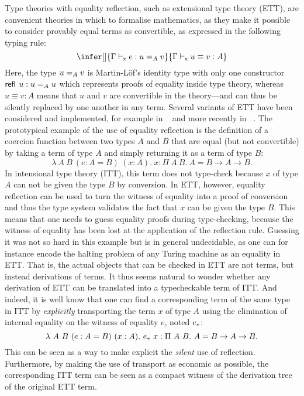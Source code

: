 Type theories with equality reflection, such as extensional type
theory (ETT), are convenient theories in which to formalise
mathematics, as they make it possible to consider provably equal terms as
convertible, as expressed in the following typing rule:
%
\begin{equation}
  \label{eq:reflection}
  \infer[]
    {\xisterm{\Ga}{e}{\Eq{A}{u}{v}}}
    {\xeqterm{\Ga}{u}{v}{A}}
\end{equation}
%
Here, the type $\Eq{A}{u}{v}$ is Martin-Löf's identity type with only
one constructor $\refl{} u : \Eq{A}{u}{u}$ which represents
proofs of equality inside type theory, whereas $u \equiv v : A$ means
that $u$ and $v$ are convertible in the theory---and can thus be
silently replaced by one another in any term.
%
Several variants of ETT have been considered and implemented, for
example in \NuPRL{}~ and more recently in
\Andromeda~.
%
The prototypical example of the use of equality reflection is the
definition of a coercion function between two types $A$ and $B$ that
are equal (but not convertible) by taking a term of type $A$ and
simply returning it as a term of type $B$:
\[
\lambda\ A\ B \ (e:A = B)\ (x:A).\ x
: \Pi\ A\ B.\ A = B \to A \to B.
\]
%
%
In intensional type theory (ITT), this term does not type-check
because $x$ of type $A$ can not be given the type $B$ by conversion.
%
In ETT, however, equality reflection can be used to turn the witness
of equality into a proof of conversion and thus the type system
validates the fact that $x$ can be given the type $B$.
%
This means that one needs to guess equality proofs
during type-checking, because the witness of equality has been lost at
the application of the reflection rule. Guessing it was not so hard in this
example but is in general undecidable, as one can for instance encode the
halting problem of any Turing machine as an equality in ETT.
%
That is, the actual objects that can be checked in ETT are not terms,
but instead derivations of terms.
%
It thus seems natural to wonder whether any derivation of ETT can be
translated into a typecheckable term of ITT.
%
And indeed, it is well know that one can find a corresponding term of
the same type in ITT by \emph{explicitly} transporting the term $x$
of type $A$ using the elimination of internal equality on the witness
of equality $e$, noted $\transpo{e}$:
%
\[
  \lambda\ A\ B \ (e:A = B)\ (x:A).\ \transpo{e}\ x
  : \Pi\ A\ B.\ A = B \to A \to B.
\]
%
This can be seen as a way to make explicit the \emph{silent} use of
reflection.
%
Furthermore, by making the use of transport as economic as possible,
the corresponding ITT term can be seen as a compact witness of the
derivation tree of the original ETT term.


